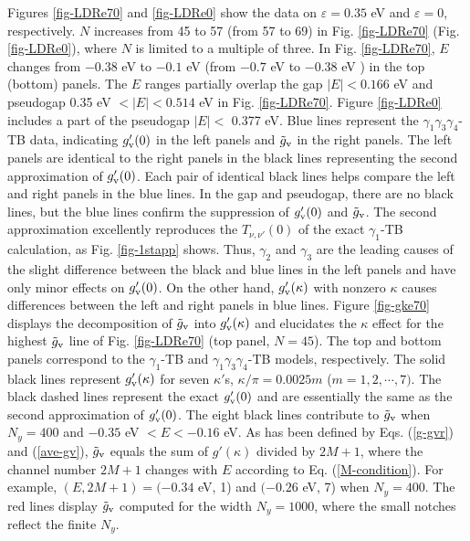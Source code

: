 \documentclass{jpsj3}
\begin{document}
Figures \ref{fig-LDRe70} 
and \ref{fig-LDRe0}
show the data on $\varepsilon=0.35$ eV
and $\varepsilon=0$, respectively.
$N$ increases from 45 to 57 (from 57 to 69)
in Fig. \ref{fig-LDRe70} (Fig. \ref{fig-LDRe0}),
where $N$ is limited to a multiple of three.
In Fig. \ref{fig-LDRe70}, $E$ changes from $-0.38$ eV to $-0.1$ eV
(from $-0.7$ eV to $-0.38$ eV ) in the top (bottom) panels.
The $E$ ranges partially overlap the gap $|E| < 0.166$ eV
and pseudogap 0.35 eV $ < |E| < 0.514$ eV
in Fig. \ref{fig-LDRe70}.
Figure \ref{fig-LDRe0}
includes a part of the pseudogap $|E| <$ 0.377 eV.
Blue lines represent the $\gamma_1\gamma_3\gamma_4$-TB data, indicating $g'_{\rm v}(0)$ in the left panels
and $\tilde{g}_{\rm v}$ in the right panels.
The left panels are identical to the right panels
in the black lines representing the second approximation of $g'_{\rm v}(0)$.
Each pair of identical black lines helps compare
the left and right panels in the blue lines.
In the gap and pseudogap,  there are no black lines,
but the blue lines confirm the suppression of $g'_{\rm v}(0)$ and
$\tilde{g}_{\rm v}$.
The second approximation excellently reproduces
the $T_{\nu,\nu'}(0)$ of the exact $\gamma_1$-TB calculation, 
as Fig. \ref{fig-1stapp} shows.
Thus, $\gamma_2$ and $\gamma_3$ are the leading causes 
of the slight difference between the black and blue lines in 
the left panels and have only minor effects on $g'_{\rm v}(0)$.
On the other hand, $g'_{\rm v}(\kappa)$ with nonzero $\kappa$ 
causes differences between 
the left and right panels in blue lines.
Figure \ref{fig-gke70}
displays the decomposition of  $\tilde{g}_{\rm v}$ 
into $g'_{\rm v}(\kappa)$
and elucidates the $\kappa$ effect 
for the highest $\tilde{g}_{\rm v}$ line of Fig. \ref{fig-LDRe70}
(top panel, $N=45$).
The top and bottom panels correspond to the $\gamma_1$-TB and 
$\gamma_1\gamma_3\gamma_4$-TB models, respectively.
The solid black lines represent
$g'_{\rm v}(\kappa)$ 
for seven $\kappa'$s, $\kappa/\pi= 0.0025m$ ($m=1,2,\cdots,7)$.
The black dashed lines represent the exact $g'_{\rm v}(0)$
and are 
essentially the same as the second approximation of $g'_{\rm v}(0)$.
The eight black lines contribute to $\tilde{g}_{\rm v}$ 
when $N_y=400$ and $ -0.35$ eV $< E < -0.16$ eV.
As has been defined by Eqs. (\ref{g-gvr}) and (\ref{ave-gv}), 
$\tilde{g}_{\rm v}$ equals the sum of $g'(\kappa)$ divided by $2M+1$,
where the channel number $2M+1$ changes with $E$ according to Eq. (\ref{M-condition}).
For example, $(E ,2M+1)=(-0.34$ eV, 1) and $(-0.26$ eV, 7)
when $N_y=400$. 
The red lines display 
$\tilde{g}_{\rm v}$
computed for the width $N_y=1000$, where the small notches reflect the finite $N_y$. 
\end{document}
